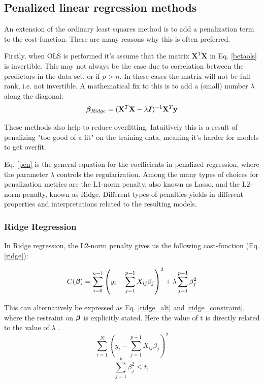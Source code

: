 \subsection{Penalized linear regression methods}\label{pen-reg}

An extension of the ordinary least squares method is to add a penalization term to the cost-function. There are many reasons why this is often preferred. 

Firstly, when OLS is performed it's assume that the matrix $\boldsymbol{X}^T\boldsymbol{X}$ in Eq. \ref{betaols} is invertible. This may not always be the case due to correlation between the predictors in the data set, or if $p > n$. In these cases the matrix will not be full rank, i.e. not invertible. 
A mathematical fix to this is to add a (small) number $\lambda$ along the diagonal: 
\begin{equation}\label{pen}
    \boldsymbol{\beta}_{Ridge} = (\mathbf{X}^T\mathbf{X}- \lambda\boldsymbol{I})^{-1}\mathbf{X}^T\mathbf{y}
\end{equation}

These methods also help to reduce overfitting. Intuitively this is a result of penalizing "too good of a fit" on the training data, meaning it's harder for models to get overfit. 

Eq. \ref{pen} is the general equation for the coefficients in penalized regression, where the parameter $\lambda$ controls the regularization. Among the many types of choices for penalization metrics are the L1-norm penalty, also known as Lasso, and the L2-norm penalty, known as Ridge. Different types of penalties yields in different properties and interpretations related to the resulting models.

\subsubsection{Ridge Regression}\label{ridge_sec}

In Ridge regression, the L2-norm penalty gives us the following cost-function (Eq. \ref{ridge}):

\begin{equation}\label{ridge}
     C(\boldsymbol{\beta}) = \sum_{i=0}^{n-1} \left( y_i - \sum_{j=1}^{p-1} X_{ij}\beta_j \right)^2 + \lambda\sum_{j=1}^{p-1} \beta_j^2 
\end{equation}




This can alternatively be expressed as Eq. \ref{ridge_alt} and \ref{ridge_constraint}, where the restraint on $\boldsymbol{\beta}$ is explicitly stated. Here the value of t is directly related to the value of $\lambda$ \citep[p. 63]{hastie}.
\begin{equation}\label{ridge_alt}
    \sum_{i=1}^N \left(y_i - \sum_{j=1}^{p-1} X_{ij}\beta_j \right)^2
\end{equation}
\begin{equation}\label{ridge_constraint}
    \sum_{j=1}^p \beta_j^2 \leq t, 
\end{equation}


